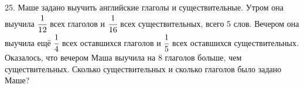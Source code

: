 25. Маше задано выучить английские глаголы и существительные. Утром она выучила $\cfrac{1}{12}$ всех глаголов и $\cfrac{1}{16}$ всех существительных, всего 5 слов. Вечером она выучила ещё $\cfrac{1}{4}$ всех оставшихся глаголов и $\cfrac{1}{5}$ всех оставшихся существительных. Оказалось, что вечером Маша выучила на 8 глаголов больше, чем существительных. Сколько существительных и сколько глаголов было задано Маше?\\
